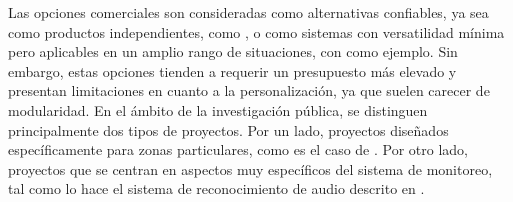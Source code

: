 Las opciones comerciales son consideradas como alternativas confiables, ya sea como productos independientes, como \cite{Solutionbee}, o como sistemas con versatilidad mínima pero aplicables en un amplio rango de situaciones, con \cite{OpenEnergyMonitor} como ejemplo. Sin embargo, estas opciones tienden a requerir un presupuesto más elevado y presentan limitaciones en cuanto a la personalización, ya que suelen carecer de modularidad.
En el ámbito de la investigación pública, se distinguen principalmente dos tipos de proyectos. Por un lado, proyectos diseñados específicamente para zonas particulares, como es el caso de \cite{chen_chien_hsu_jing_lin_lin_2020}. Por otro lado, proyectos que se centran en aspectos muy específicos del sistema de monitoreo, tal como lo hace el sistema de reconocimiento de audio descrito en \cite{kulyukin_mukherjee_amlathe_2018}.
